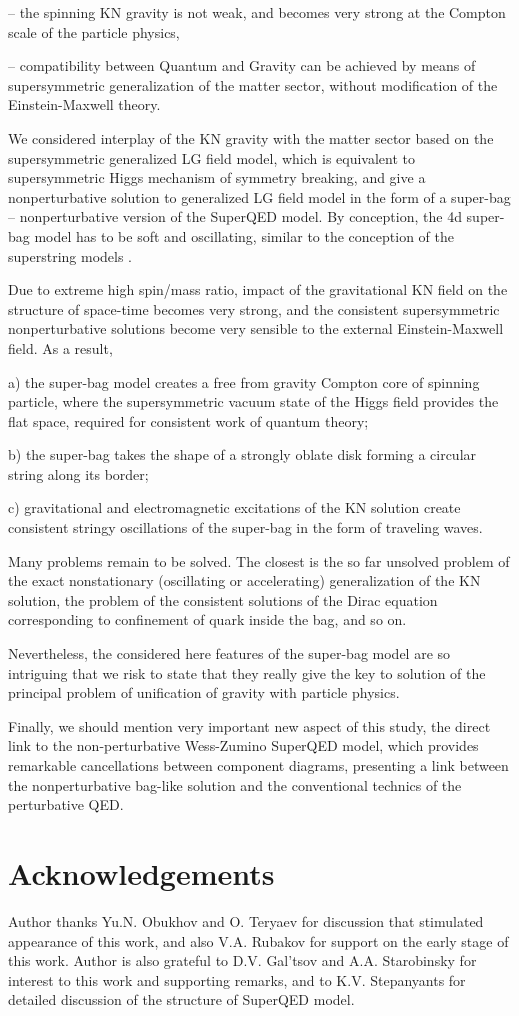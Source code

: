 \documentclass[aps,prd,twocolumn,showpacs]{revtex4}
\begin{document}
-- the spinning KN gravity is not weak, and  becomes very strong at the Compton scale of the
particle physics,

-- compatibility between Quantum and Gravity can be achieved by means of supersymmetric
generalization of the matter sector, without modification of the Einstein-Maxwell theory.


We considered interplay of the KN gravity with  the matter sector based on the supersymmetric
generalized LG field model, which is  equivalent to supersymmetric Higgs mechanism of symmetry
breaking, and give a nonperturbative solution to generalized LG field model in the form of a
super-bag -- nonperturbative version of the SuperQED model. By conception, the 4d super-bag model
has to be soft and oscillating, similar to the conception of the superstring models
\cite{SLAC,Giles,JT}.

Due to extreme high spin/mass ratio, impact of the gravitational KN field on the structure of
space-time becomes very strong, and the consistent supersymmetric nonperturbative solutions become
very sensible to the external Einstein-Maxwell field. As a result,

a) the super-bag model creates a free from gravity Compton core of spinning particle, where the
supersymmetric vacuum state of the Higgs field provides the flat space, required for consistent
work of quantum theory;

b) the super-bag takes the shape of a strongly oblate disk forming a circular string along its
border;

c) gravitational and electromagnetic excitations of the KN solution create consistent stringy
oscillations of the super-bag in the form of traveling waves.

Many problems remain to be solved.  The closest is the so far unsolved problem of the exact nonstationary (oscillating or
accelerating) generalization of the KN solution, the problem of the consistent solutions of the
Dirac equation corresponding to confinement of quark inside the bag, and so on.

Nevertheless, the considered here features of the super-bag model are so intriguing that we risk
to state that they really give  the key to solution
of the principal problem of unification of gravity with particle physics.

 Finally, we should mention very important new aspect of this study, the direct link to the non-perturbative Wess-Zumino SuperQED model, which provides remarkable cancellations between component diagrams, presenting a link between the nonperturbative bag-like solution and the conventional technics of the perturbative QED.

\section*{Acknowledgements}
Author thanks Yu.N. Obukhov and O. Teryaev for discussion that stimulated appearance of this work, and also
 V.A. Rubakov for support on the early stage of this work. Author is also grateful to  D.V. Gal'tsov and A.A. Starobinsky for interest to this work and supporting remarks, and to K.V. Stepanyants for detailed discussion of the structure of SuperQED model.
\end{document}
